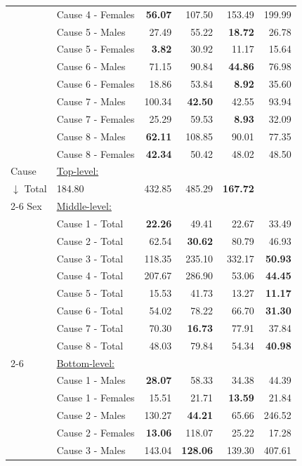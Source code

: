 \begin{center}
\begin{small}
\begin{longtable}{@{}llrrrr@{}}
& Cause 4 - Females & \textbf{56.07} & 107.50 & 153.49 & 199.99 \\
& Cause 5 - Males & 27.49 & 55.22 & \textbf{18.72} & 26.78 \\
& Cause 5 - Females & \textbf{3.82} & 30.92 & 11.17 & 15.64 \\
& Cause 6 - Males & 71.15 & 90.84 & \textbf{44.86} & 76.98 \\
& Cause 6 - Females & 18.86 & 53.84 & \textbf{8.92} & 35.60 \\
& Cause 7 - Males & 100.34 & \textbf{42.50} & 42.55 & 93.94 \\
& Cause 7 - Females & 25.29 & 59.53 & \textbf{8.93} & 32.09 \\
& Cause 8 - Males & \textbf{62.11} & 108.85 & 90.01 & 77.35 \\
& Cause 8 - Females & \textbf{42.34} & 50.42 & 48.02 & 48.50 \\
\midrule
Cause & \multicolumn{5}{l}{\underline{Top-level:}}\\
$\downarrow$  Total & 184.80 & 432.85 & 485.29 & \textbf{167.72} \\
\cmidrule{2-6}
Sex & \multicolumn{5}{l}{\underline{Middle-level:}}\\
& Cause 1 - Total & \textbf{22.26} & 49.41 & 22.67 & 33.49 \\
& Cause 2 - Total & 62.54 & \textbf{30.62} & 80.79 & 46.93 \\
& Cause 3 - Total & 118.35 & 235.10 & 332.17 & \textbf{50.93} \\
& Cause 4 - Total & 207.67 & 286.90 & 53.06 & \textbf{44.45} \\
& Cause 5 - Total & 15.53 & 41.73 & 13.27 & \textbf{11.17} \\
& Cause 6 - Total & 54.02 & 78.22 & 66.70 & \textbf{31.30} \\
& Cause 7 - Total & 70.30 & \textbf{16.73} & 77.91 & 37.84 \\
& Cause 8 - Total & 48.03 & 79.84 & 54.34 & \textbf{40.98} \\
\cmidrule{2-6}
& \multicolumn{5}{l}{\underline{Bottom-level:}}\\
& Cause 1 - Males & \textbf{28.07} & 58.33 & 34.38 & 44.39 \\
& Cause 1 - Females & 15.51 & 21.71 & \textbf{13.59} & 21.84 \\
& Cause 2 - Males & 130.27 & \textbf{44.21} & 65.66 & 246.52 \\
& Cause 2 - Females & \textbf{13.06} & 118.07 & 25.22 & 17.28 \\
& Cause 3 - Males & 143.04 & \textbf{128.06} & 139.30 & 407.61 \\

\end{longtable}
\end{small}
\end{center}
